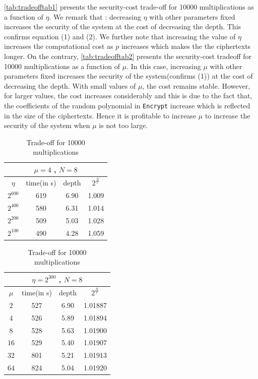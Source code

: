 \documentclass{acm_proc_article-sp}
\begin{document}
\autoref{tab:tradeofftab1} presents the security-cost trade-off for 10000 multiplications as a function of $\eta$. We remark that : decreasing $\eta$ with other parameters fixed increases the security of the system at the cost of decreasing the depth. This confirms equation (1) and (2).  We further note that increasing the value of $\eta$ increases the computational cost as $p$ increases which makes the the ciphertexts longer. On the contrary, \autoref{tab:tradeofftab2} presents the security-cost tradeoff for 10000 multiplications as a function of $\mu$. In this case, increasing $\mu$ with other parameters fixed increases the security of the system(confirms (1)) at the cost of decreasing the depth. With small values of $\mu$, the cost remains stable. However, for larger values, the cost increases considerably and this is due to the fact that, the coefficients of the random polynomial in \texttt{Encrypt} increase  which is reflected in the size of the ciphertexts. Hence it is profitable to increase $\mu$ to increase the security of the system when $\mu$ is not too large.

\begin{table}[htb]
  \centering
  \caption{Trade-off for 10000 multiplications}
\begin{tabular}{|c|c|c|c||}
  \hline
  \multicolumn{4}{|c||}{$\mu = 4$ , $N=8$} \\
  \hline
  $\eta$ &  time(in s)  & depth & $2^{\frac{N}{\epsilon}}$ \\
  \hline
  $2^{600}$ & 619  & 6.90 & 1.009 \\
  $2^{400}$ &  580 & 6.31 & 1.014 \\
  $2^{200}$ &  509 & 5.03 & 1.028 \\
  $2^{100}$ &  490 & 4.28 & 1.059 \\
   \hline
\end{tabular}
\normalsize
\label{tab:tradeofftab1}
\end{table}

\begin{table}[htb]
  \centering
  \caption{Trade-off for 10000 multiplications}
\begin{tabular}{|c|c|c|c||}
  \hline
  \multicolumn{4}{|c||}{$\eta = 2^{300}$ , $N=8$} \\
  \hline
  $\mu$ &  time(in s)  & depth & $2^{\frac{N}{\epsilon}}$ \\
  \hline
  $2$ & 527  & 6.90 & 1.01887 \\
  $4$ & 526 & 5.89 & 1.01894 \\
  $8$ & 528  & 5.63 & 1.01900 \\
  $16$ & 529  & 5.40 & 1.01907 \\
  $32$ & 801  & 5.21 & 1.01913 \\
  $64$ & 824  & 5.04 & 1.01920 \\

   \hline
\end{tabular}
\normalsize
\label{tab:tradeofftab2}
\end{table}
\end{document}
